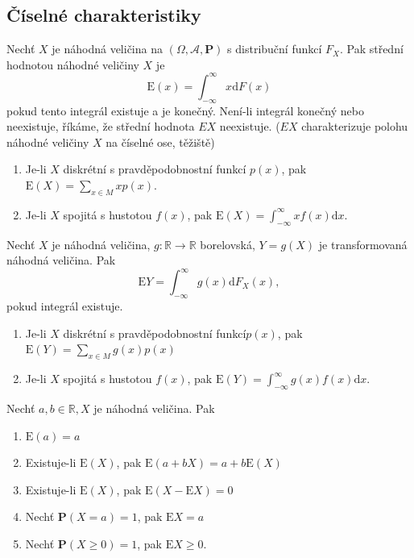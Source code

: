 \subsection{Číselné charakteristiky}
\begin{definition}
Nechť $X$ je náhodná veličina na $(\Omega,\mathcal{A},\textbf{P})$ s distribuční funkcí $F_X$. Pak střední hodnotou náhodné veličiny $X$ je
\begin{equation}
\mathrm{E}(x)=\int_{-\infty}^{\infty} x\mathrm{d}F(x)
\end{equation}
pokud tento integrál existuje a je konečný. Není-li integrál konečný nebo neexistuje, říkáme, že střední hodnota $EX$ neexistuje. ($EX$ charakterizuje polohu náhodné veličiny $X$ na číselné ose, těžiště)
\end{definition}

\begin{enumerate}
\item Je-li $X$ diskrétní s pravděpodobnostní funkcí $p(x)$, pak $\mathrm{E}(X)=\sum_{x\in M}xp(x).$
\item Je-li $X$ spojitá s hustotou $f(x)$, pak $\mathrm{E}(X)=\int_{-\infty}^{\infty} x f(x)\mathrm{d}x .$
\end{enumerate}

\begin{theorem}
Nechť $X$ je náhodná veličina, $g:\mathbb{R}\rightarrow \mathbb{R}$ borelovská, $Y=g(X)$ je transformovaná náhodná veličina. Pak
\begin{equation}
\mathrm{E}Y=\int_{-\infty}^{\infty}g(x)\mathrm{d}F_X(x),
\end{equation}
pokud integrál existuje.
\begin{enumerate}
\item Je-li $X$ diskrétní s pravděpodobnostní funkcí$p(x)$, pak $\mathrm{E}(Y)=\sum_{x\in M} g(x)p(x)$
\item Je-li $X$ spojitá s hustotou $f(x)$, pak $\mathrm{E}(Y)=\int_{-\infty}^{\infty} g(x)f(x)\mathrm{d}x.$
\end{enumerate}
\end{theorem}

\begin{theorem}
Nechť $a,b \in \mathbb{R},X$ je náhodná veličina. Pak
\begin{enumerate}
\item $\mathrm{E}(a)=a$
\item Existuje-li $\mathrm{E}(X)$, pak $\mathrm{E}(a+bX)=a+b\mathrm{E}(X)$
\item Existuje-li $\mathrm{E}(X)$, pak $\mathrm{E}(X-\mathrm{E}X)=0$
\item Nechť $\textbf{P}(X=a)=1$, pak $\mathrm{E}X=a$
\item Nechť $\textbf{P}(X\geq 0)=1$, pak $\mathrm{E}X\geq 0.$
\end{enumerate}
\end{theorem}

